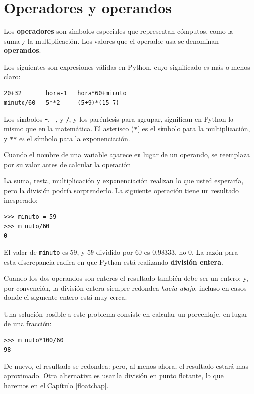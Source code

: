 \section{Operadores y operandos}

Los {\bf operadores} son símbolos especiales que representan cómputos,
como la suma y la multiplicación. Los valores que el operador usa se denominan
{\bf operandos}.

Los siguientes son expresiones válidas en Python, cuyo significado es más o menos claro:
\beforeverb
\begin{verbatim}
20+32       hora-1   hora*60+minuto   
minuto/60   5**2     (5+9)*(15-7)
\end{verbatim}
\afterverb
%
Los  símbolos \texttt{+}, \texttt{-}, y \texttt{/}, y los paréntesis para
agrupar, significan en Python lo mismo que en la matemática.
El asterisco (\texttt{*}) es el símbolo para la multiplicación, y \texttt{**} es el  símbolo para la exponenciación.

Cuando el nombre de una variable aparece en lugar de un operando, se
reemplaza por su valor antes de calcular la operación

La suma, resta, multiplicación y exponenciación realizan lo que usted
esperaría, pero la división podría sorprenderlo.  La siguiente
operación tiene un resultado inesperado:

\beforeverb
\begin{verbatim}
>>> minuto = 59
>>> minuto/60
0
\end{verbatim}
\afterverb
%
El valor de \texttt{minuto} es 59, y 59 dividido por 60 es 0.98333,
no 0.  La razón para esta discrepancia radica en que Python está realizando
{\bf división entera}.


Cuando los dos operandos son enteros el resultado también debe ser un entero; y, por convención, la división entera siempre redondea {\em hacia abajo}, incluso en casos donde el siguiente entero está muy cerca.

Una solución posible a este problema consiste en calcular un porcentaje, en lugar de una fracción:

\beforeverb
\begin{verbatim}
>>> minuto*100/60
98
\end{verbatim}
\afterverb
%
De nuevo, el resultado se redondea; pero, al menos ahora, el resultado estará mas aproximado.  Otra alternativa es usar la división en punto
flotante, lo que haremos en el Capítulo \ref{floatchap}.


